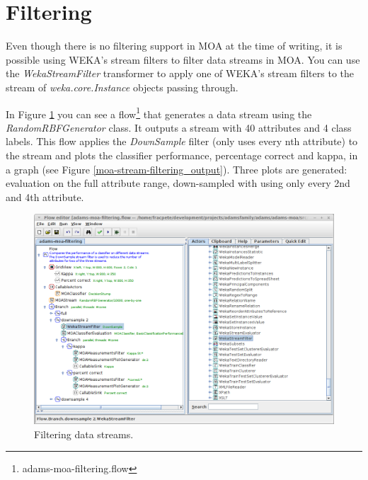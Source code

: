 \documentclass[a4paper]{book}
\begin{document}
\clearpage
\newpage
\section{Filtering}
Even though there is no filtering support in MOA at the time of writing, it is
possible using WEKA's stream filters to filter data streams in MOA.
You can use the \textit{WekaStreamFilter} transformer to apply one of WEKA's
stream filters to the stream of \textit{weka.core.Instance} objects passing
through.

In Figure \ref{moa-stream-filtering_flow} you can see a flow\footnote{adams-moa-filtering.flow} 
that generates a data stream using the \textit{RandomRBFGenerator} class. It
outputs a stream with 40 attributes and 4 class labels. This flow applies
the \textit{DownSample} filter (only uses every nth attribute) to the stream
and plots the classifier performance, percentage correct and kappa, in a graph
(see Figure \ref{moa-stream-filtering_output}). Three plots are generated: evaluation
on the full attribute range, down-sampled with using only every 2nd and 4th
attribute.

\begin{figure}[htb]
  \centering
  \includegraphics[width=12.0cm]{images/moa-stream-filtering_flow.png}
  \caption{Filtering data streams.}
  \label{moa-stream-filtering_flow}
\end{figure}
\end{document}
